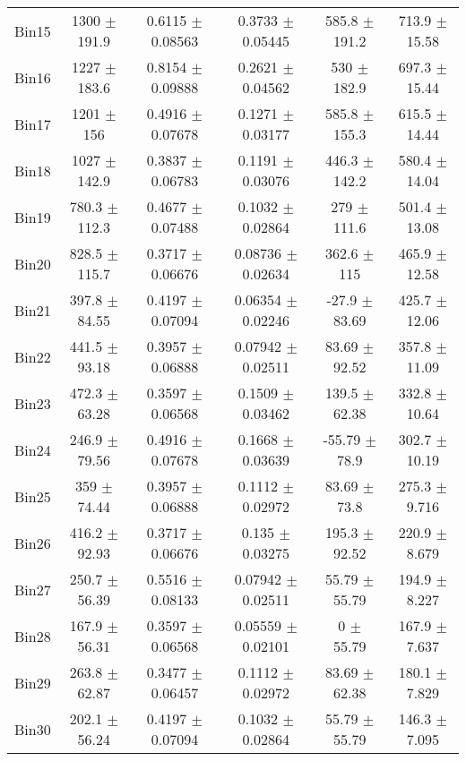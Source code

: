 \begin{tabular}{@{\extracolsep{4pt}}lccccc@{}}
     Bin15 & 1300 $\pm$ 191.9 & 0.6115 $\pm$ 0.08563 & 0.3733 $\pm$ 0.05445 & 585.8 $\pm$ 191.2 & 713.9 $\pm$ 15.58 \\ 
     Bin16 & 1227 $\pm$ 183.6 & 0.8154 $\pm$ 0.09888 & 0.2621 $\pm$ 0.04562 & 530 $\pm$ 182.9 & 697.3 $\pm$ 15.44 \\ 
     Bin17 & 1201 $\pm$ 156 & 0.4916 $\pm$ 0.07678 & 0.1271 $\pm$ 0.03177 & 585.8 $\pm$ 155.3 & 615.5 $\pm$ 14.44 \\ 
     Bin18 & 1027 $\pm$ 142.9 & 0.3837 $\pm$ 0.06783 & 0.1191 $\pm$ 0.03076 & 446.3 $\pm$ 142.2 & 580.4 $\pm$ 14.04 \\ 
     Bin19 & 780.3 $\pm$ 112.3 & 0.4677 $\pm$ 0.07488 & 0.1032 $\pm$ 0.02864 & 279 $\pm$ 111.6 & 501.4 $\pm$ 13.08 \\ 
     Bin20 & 828.5 $\pm$ 115.7 & 0.3717 $\pm$ 0.06676 & 0.08736 $\pm$ 0.02634 & 362.6 $\pm$ 115 & 465.9 $\pm$ 12.58 \\ 
     Bin21 & 397.8 $\pm$ 84.55 & 0.4197 $\pm$ 0.07094 & 0.06354 $\pm$ 0.02246 & -27.9 $\pm$ 83.69 & 425.7 $\pm$ 12.06 \\ 
     Bin22 & 441.5 $\pm$ 93.18 & 0.3957 $\pm$ 0.06888 & 0.07942 $\pm$ 0.02511 & 83.69 $\pm$ 92.52 & 357.8 $\pm$ 11.09 \\ 
     Bin23 & 472.3 $\pm$ 63.28 & 0.3597 $\pm$ 0.06568 & 0.1509 $\pm$ 0.03462 & 139.5 $\pm$ 62.38 & 332.8 $\pm$ 10.64 \\ 
     Bin24 & 246.9 $\pm$ 79.56 & 0.4916 $\pm$ 0.07678 & 0.1668 $\pm$ 0.03639 & -55.79 $\pm$ 78.9 & 302.7 $\pm$ 10.19 \\ 
     Bin25 & 359 $\pm$ 74.44 & 0.3957 $\pm$ 0.06888 & 0.1112 $\pm$ 0.02972 & 83.69 $\pm$ 73.8 & 275.3 $\pm$ 9.716 \\ 
     Bin26 & 416.2 $\pm$ 92.93 & 0.3717 $\pm$ 0.06676 & 0.135 $\pm$ 0.03275 & 195.3 $\pm$ 92.52 & 220.9 $\pm$ 8.679 \\ 
     Bin27 & 250.7 $\pm$ 56.39 & 0.5516 $\pm$ 0.08133 & 0.07942 $\pm$ 0.02511 & 55.79 $\pm$ 55.79 & 194.9 $\pm$ 8.227 \\ 
     Bin28 & 167.9 $\pm$ 56.31 & 0.3597 $\pm$ 0.06568 & 0.05559 $\pm$ 0.02101 & 0 $\pm$ 55.79 & 167.9 $\pm$ 7.637 \\ 
     Bin29 & 263.8 $\pm$ 62.87 & 0.3477 $\pm$ 0.06457 & 0.1112 $\pm$ 0.02972 & 83.69 $\pm$ 62.38 & 180.1 $\pm$ 7.829 \\ 
     Bin30 & 202.1 $\pm$ 56.24 & 0.4197 $\pm$ 0.07094 & 0.1032 $\pm$ 0.02864 & 55.79 $\pm$ 55.79 & 146.3 $\pm$ 7.095 \\ 
\hline\hline
  \end{tabular}
